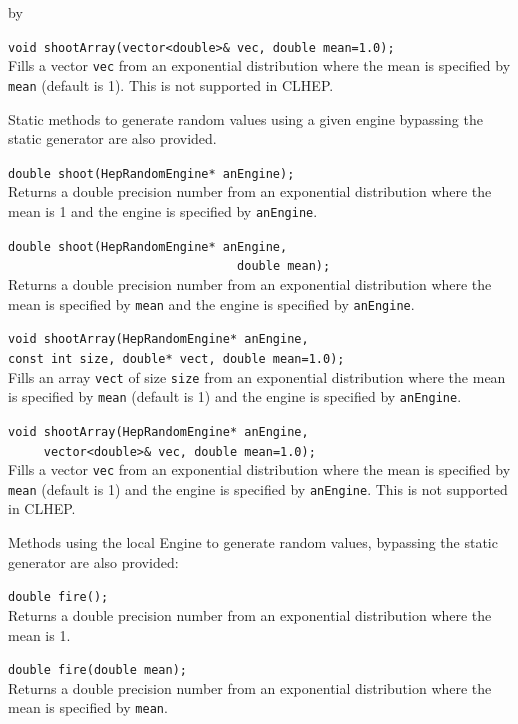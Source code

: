 \documentclass[twoside]{article}
\newcommand{\comp}[1]{\texttt{#1}}%
\newcommand{\entrylabel}[1]{\mbox{\textbf{{#1}}}\hfil}%
\newenvironment{entry}
{\begin{list}{}%
    {\renewcommand{\makelabel}{\entrylabel}%
     \setlength{\labelwidth}{90pt}%
     \setlength{\leftmargin}{\labelwidth}
     \advance\leftmargin by \labelsep%
      }%
    }%
  {\end{list}}
\newcommand{\Entrylabel}[1]%
{\raisebox{0pt}[1ex][0pt]{\makebox[\labelwidth][l]%
    {\parbox[t]{\labelwidth}{\hspace{0pt}\textbf{{#1}}}}}}
\newenvironment{Entry}%
{\renewcommand{\entrylabel}{\Entrylabel}\begin{entry}}%
  {\end{entry}}
\begin{document}
\begin{description}
\begin{Entry}
   \verb+void shootArray(vector<double>& vec, double mean=1.0);+\\
   Fills a vector \comp{vec} from an exponential distribution
   where the mean is specified by \comp{mean} (default is 1).  This
   is not supported in CLHEP.
 
   Static methods to generate random values using a given engine
   bypassing the static generator are also provided.

   \verb+double shoot(HepRandomEngine* anEngine);+\\
   Returns a double precision number from an exponential  distribution where the
   mean is 1 and the engine is specified by \comp{anEngine}.
  
   \verb+double shoot(HepRandomEngine* anEngine,+\\
   \verb+                                double mean);+\\
   Returns a double precision number from an exponential distribution where the
   mean is specified by \comp{mean} and the engine is specified
   by \comp{anEngine}.
  
   \verb+void shootArray(HepRandomEngine* anEngine,+\\
   \verb+const int size, double* vect, double mean=1.0);+\\
   Fills an array \comp{vect} of size \comp{size} from an exponential distribution
   where the mean is specified by \comp{mean} (default is 1) and
   the engine is specified by \comp{anEngine}.

   \verb+void shootArray(HepRandomEngine* anEngine,+\\
   \verb+     vector<double>& vec, double mean=1.0);+\\
   Fills a vector \comp{vec} from an exponential distribution
   where the mean is specified by \comp{mean} (default is 1) and
   the engine is specified by \comp{anEngine}.  This is not supported
   in CLHEP.
   
   Methods using the local Engine to generate random values, bypassing
   the static generator are also provided:

   \verb+double fire();+\\
   Returns a double precision number from an exponential distribution where the
   mean is 1.
  
   \verb+double fire(double mean);+\\
   Returns a double precision number from an exponential distribution where the
   mean is specified by \comp{mean}.


\end{Entry}
\end{description}
\end{document}
